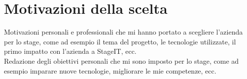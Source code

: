 \section{Motivazioni della scelta}
\label{sez:motivazioni-scelta}

Motivazioni personali e professionali che mi hanno portato a scegliere l'azienda per lo stage, come ad esempio il tema del progetto, le tecnologie utilizzate, 
il primo impatto con l'azienda a StageIT, ecc.\\

Redazione degli obiettivi personali che mi sono imposto per lo stage, come ad esempio imparare nuove tecnologie, migliorare le mie competenze, ecc.\\